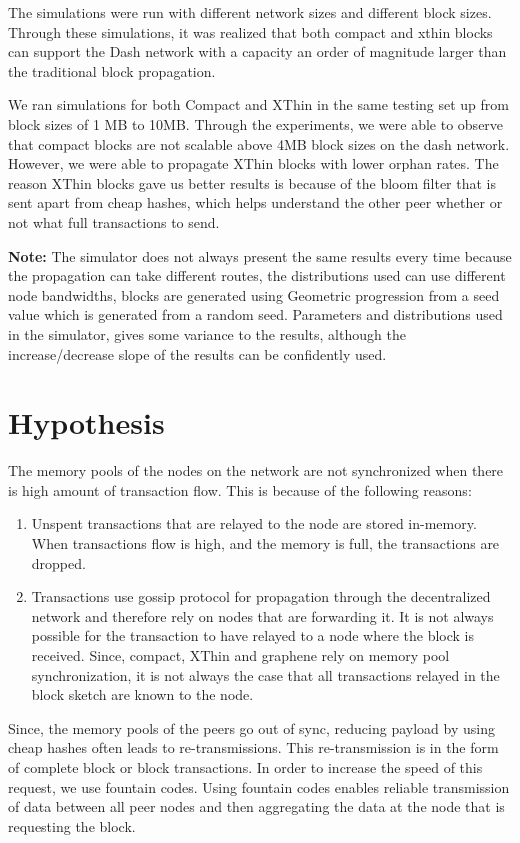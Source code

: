 The simulations were run with different network sizes and different block sizes.
Through these simulations, it was realized that both compact and xthin blocks
can support the Dash network with a capacity an order of magnitude larger than
the traditional block propagation.

We ran simulations for both Compact and XThin in the same testing set up from
block sizes of 1 MB to 10MB. 
Through the experiments, we were able to observe that compact blocks are not
scalable above 4MB block sizes on the dash network. However, we were able to
propagate XThin blocks with lower orphan rates.
The reason XThin blocks gave us better results is because of the bloom filter
that is sent apart from cheap hashes, which helps understand the other peer
whether or not what full transactions to send.

\textbf{Note:} The simulator does not always present the same results every time because the propagation can take different routes, the distributions used can use different node bandwidths, blocks are generated using Geometric progression from a seed value which is generated from a random seed. Parameters and distributions used in the simulator, gives some variance to the results, although the increase/decrease slope of the results can be confidently used.


\section{Hypothesis}
The memory pools of the nodes on the network are not synchronized when there is
high amount of transaction flow. This is because of the following reasons:


\begin{enumerate}
    \item Unspent transactions that are relayed to the node are stored
        in-memory. When transactions flow is high, and the memory is full, the
        transactions are dropped.
    \item Transactions use gossip protocol for propagation through the decentralized network and therefore rely on nodes that are forwarding it. It is not always possible for the transaction to have relayed to a node where the block is received. Since, compact, XThin and graphene rely on memory pool synchronization, it is not always the case that all transactions relayed in the block sketch are known to the node. 
\end{enumerate}

Since, the memory pools of the peers go out of sync, reducing payload by using
cheap hashes often leads to re-transmissions. This re-transmission is in the
form of complete block or block transactions. In order to increase the speed of
this request, we use fountain codes. Using fountain codes enables reliable
transmission of data between all peer nodes and then aggregating the data at the
node that is requesting the block.

